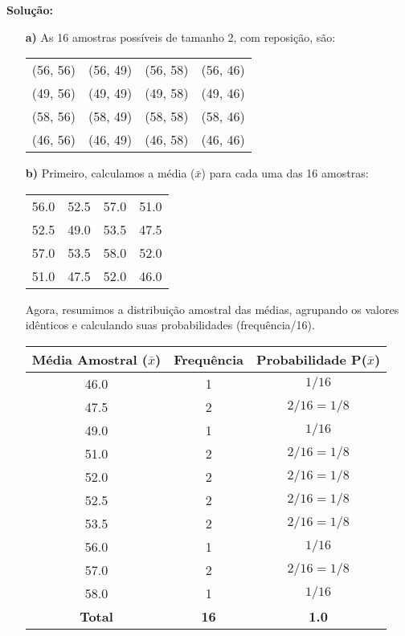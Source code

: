 \documentclass[12pt, a4paper]{article}
\begin{document}
\textbf{Solução:}
\begin{itemize}
    \item[\textbf{a)}] As 16 amostras possíveis de tamanho 2, com reposição, são:
    \begin{center}
    \begin{tabular}{cccc}
        \toprule
        (56, 56) & (56, 49) & (56, 58) & (56, 46) \\
        (49, 56) & (49, 49) & (49, 58) & (49, 46) \\
        (58, 56) & (58, 49) & (58, 58) & (58, 46) \\
        (46, 56) & (46, 49) & (46, 58) & (46, 46) \\
        \bottomrule
    \end{tabular}
    \end{center}
    
    \item[\textbf{b)}] Primeiro, calculamos a média ($\bar{x}$) para cada uma das 16 amostras:
    \begin{center}
    \begin{tabular}{cccc}
        \toprule
        56.0 & 52.5 & 57.0 & 51.0 \\
        52.5 & 49.0 & 53.5 & 47.5 \\
        57.0 & 53.5 & 58.0 & 52.0 \\
        51.0 & 47.5 & 52.0 & 46.0 \\
        \bottomrule
    \end{tabular}
    \end{center}
    
    Agora, resumimos a distribuição amostral das médias, agrupando os valores idênticos e calculando suas probabilidades (frequência/16).
    \begin{center}
    \begin{tabular}{ccc}
        \toprule
        \textbf{Média Amostral ($\bar{x}$)} & \textbf{Frequência} & \textbf{Probabilidade P($\bar{x}$)} \\
        \midrule
        46.0 & 1 & $1/16$ \\
        47.5 & 2 & $2/16 = 1/8$ \\
        49.0 & 1 & $1/16$ \\
        51.0 & 2 & $2/16 = 1/8$ \\
        52.0 & 2 & $2/16 = 1/8$ \\
        52.5 & 2 & $2/16 = 1/8$ \\
        53.5 & 2 & $2/16 = 1/8$ \\
        56.0 & 1 & $1/16$ \\
        57.0 & 2 & $2/16 = 1/8$ \\
        58.0 & 1 & $1/16$ \\
        \midrule
        \textbf{Total} & \textbf{16} & \textbf{1.0} \\
        \bottomrule
    \end{tabular}
    \end{center}
\end{itemize}
\end{document}
